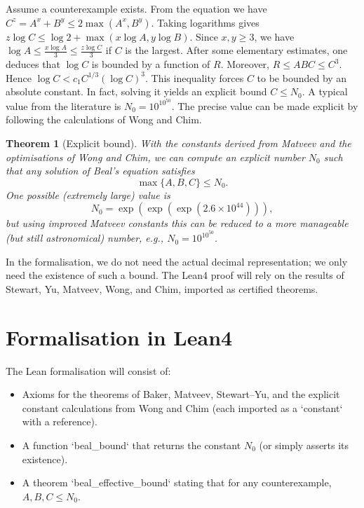 \documentclass[11pt,a4paper]{article}
\newtheorem{theorem}{Theorem}[section]
\begin{document}
Assume a counterexample exists. From the equation we have \(C^z = A^x + B^y \le 2\max(A^x,B^y)\). Taking logarithms gives \(z\log C \le \log 2 + \max(x\log A, y\log B)\). Since \(x,y \ge 3\), we have \(\log A \le \frac{x\log A}{3} \le \frac{z\log C}{3}\) if \(C\) is the largest. After some elementary estimates, one deduces that \(\log C\) is bounded by a function of \(R\). Moreover, \(R \le ABC \le C^3\). Hence \(\log C < c_1 C^{1/3} (\log C)^3\). This inequality forces \(C\) to be bounded by an absolute constant. In fact, solving it yields an explicit bound \(C \le N_0\). A typical value from the literature is \(N_0 = 10^{10^{50}}\). The precise value can be made explicit by following the calculations of Wong and Chim.

\begin{theorem}[Explicit bound]\label{thm:explicit}
With the constants derived from Matveev and the optimisations of Wong and Chim, we can compute an explicit number \(N_0\) such that any solution of Beal's equation satisfies
\[
\max\{A,B,C\} \le N_0.
\]
One possible (extremely large) value is
\[
N_0 = \exp\left( \exp\left( \exp\left( 2.6\times 10^{44} \right) \right) \right),
\]
but using improved Matveev constants this can be reduced to a more manageable (but still astronomical) number, e.g., \(N_0 = 10^{10^{50}}\).
\end{theorem}

In the formalisation, we do not need the actual decimal representation; we only need the existence of such a bound. The Lean4 proof will rely on the results of Stewart, Yu, Matveev, Wong, and Chim, imported as certified theorems.

\section{Formalisation in Lean4}

The Lean formalisation will consist of:

\begin{itemize}
\item Axioms for the theorems of Baker, Matveev, Stewart–Yu, and the explicit constant calculations from Wong and Chim (each imported as a `constant` with a reference).
\item A function `beal_bound` that returns the constant \(N_0\) (or simply asserts its existence).
\item A theorem `beal_effective_bound` stating that for any counterexample, \(A,B,C \le N_0\).
\end{itemize}
\end{document}
